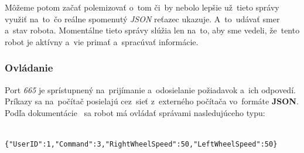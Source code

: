 	Môžeme potom začať polemizovať o~tom či~by nebolo lepšie už~tieto správy využiť na~to~čo reálne
	spomenutý \textit{JSON} reťazec ukazuje. A~to~udávať smer a~stav robota. Momentálne tieto správy slúžia len na~to,
	aby sme vedeli, že~tento robot je aktívny a~vie primať a~spracúvať informácie.

\subsubsection{Ovládanie}
\label{sec:ovladanie}

	Port \textit{665} je sprístupnený na~prijímanie a~odosielanie požiadavok a~ich odpovedí. Príkazy sa na~počítač posielajú cez~sieť z~externého
	počítača vo~formáte \textbf{JSON}. Podľa dokumentácie~\cite{BMdoc} sa robot má ovládať správami nasledujúceho typu:

	\label{jsonSpeedRequestBad}
	\begin{lstlisting}
			{"UserID":1,"Command":3,"RightWheelSpeed":50,"LeftWheelSpeed":50}
	\end{lstlisting}


